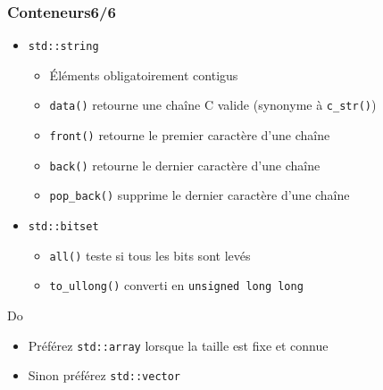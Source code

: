 \documentclass[C++.tex]{subfiles}
\begin{document}
\begin{frame}[fragile]
	\frametitle{Conteneurs\titlehfill{}6/6}
	\begin{itemize}
		\item \lstinline|std::string|
		\begin{itemize}
			\item Éléments obligatoirement contigus
			\item \lstinline|data()| retourne une chaîne C valide (synonyme à \lstinline|c_str()|)


			\item \lstinline|front()| retourne le premier caractère d'une chaîne
			\item \lstinline|back()| retourne le dernier caractère d'une chaîne
			\item \lstinline|pop_back()| supprime le dernier caractère d'une chaîne
		\end{itemize}
		\item \lstinline|std::bitset|
		\begin{itemize}
			\item \lstinline|all()| teste si tous les bits sont levés
			\item \lstinline|to_ullong()| converti en \lstinline|unsigned long long|
		\end{itemize}
	\end{itemize}

	\begin{exampleblock}{Do}
		\begin{itemize}
			\item Préférez \lstinline|std::array| lorsque la taille est fixe et connue
			\item Sinon préférez \lstinline|std::vector| 
		\end{itemize}
	\end{exampleblock}
\end{frame}
\end{document}

